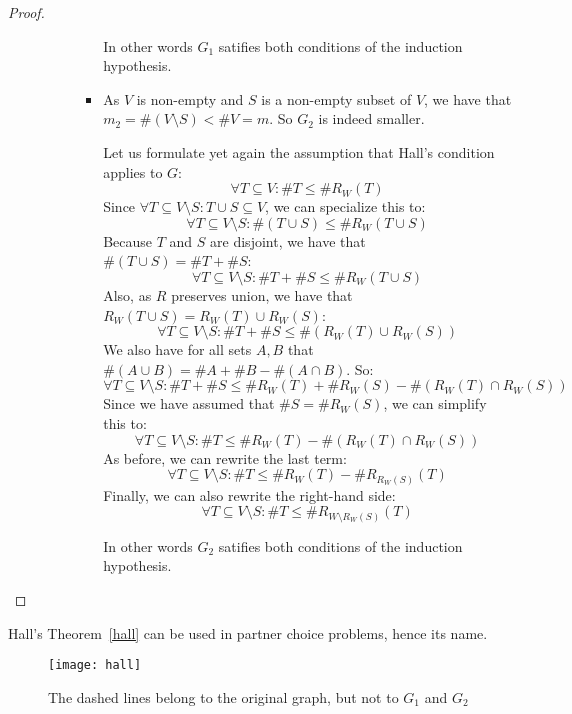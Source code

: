 \begin{proof}
\begin{itemize}
\begin{itemize}
\begin{itemize}
\begin{itemize}
In other words $G_1$ satifies both conditions of
the induction hypothesis.

\item[\dotuline{$G_2$:}]
As $V$ is non-empty and $S$ is a non-empty subset of $V$, we have that $m_2 =
\#(V \setminus S) < \#V = m$. So $G_2$ is indeed smaller.

Let us formulate yet again the assumption that Hall's condition applies to $G$:
\[ \forall T \subseteq V: \#T \leq \#R_W(T) \]
Since $\forall T \subseteq V\setminus S: T \cup S \subseteq V$, we can specialize this to:
\[ \forall T \subseteq V \setminus S: \#(T \cup S) \leq \#R_W(T \cup S) \]
Because $T$ and $S$ are disjoint, we have that $\#(T \cup S) = \#T + \#S$:
\[ \forall T \subseteq V \setminus S: \#T + \#S \leq \#R_W(T \cup S) \]
Also, as $R$ preserves union, we have that $R_W(T \cup S) = R_W(T) \cup R_W(S)$:
\[ \forall T \subseteq V \setminus S: \#T + \#S \leq \#(R_W(T) \cup R_W(S)) \]
We also have for all sets $A, B$ that $\#(A \cup B) = \#A + \#B - \#(A \cap B)$.
So:
\[ \forall T \subseteq V \setminus S: \#T + \#S \leq \#R_W(T) + \#R_W(S) - \#(R_W(T) \cap R_W(S)) \]
Since we have assumed that $\#S = \#R_W(S)$, we can simplify this to:
\[ \forall T \subseteq V \setminus S: \#T \leq \#R_W(T) - \#(R_W(T) \cap R_W(S)) \]
As before, we can rewrite the last term:
\[ \forall T \subseteq V \setminus S: \#T \leq \#R_W(T) - \#R_{R_W(S)}(T) \]
Finally, we can also rewrite the right-hand side:
\[ \forall T \subseteq V \setminus S: \#T \leq \#R_{W \setminus R_W(S)}(T) \]

In other words $G_2$ satifies both conditions of
the induction hypothesis.

\end{itemize}
\end{itemize}
\end{itemize}

\end{itemize}
\end{proof}
Hall's Theorem~\ref{hall} can be used in partner choice problems, hence its name.

\begin{figure}[h]
	\centering
	\texttt{[image: hall]}
	\caption{The dashed lines belong to the original graph, but not to $G_1$ and $G_2$}\label{hallfig}
\end{figure}






